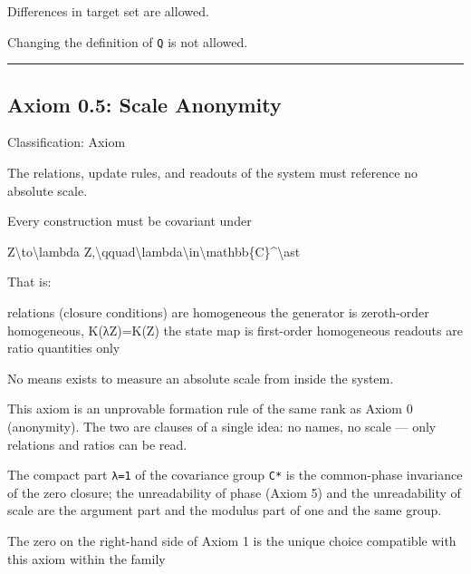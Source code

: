 \documentclass[
  a4paper,
]{article}
\newenvironment{Shaded}{}{}
\newcommand{\NormalTok}[1]{#1}
\begin{document}
Differences in target set are allowed.

Changing the definition of \texttt{Q} is not allowed.

\begin{center}\rule{0.5\linewidth}{0.5pt}\end{center}

\subsection{Axiom 0.5: Scale Anonymity}\label{axiom-0.5-scale-anonymity}

Classification: Axiom

The relations, update rules, and readouts of the system must reference
no absolute scale.

Every construction must be covariant under

\begin{Shaded}
\begin{Highlighting}[]
\NormalTok{Z\textbackslash{}to\textbackslash{}lambda Z,\textbackslash{}qquad\textbackslash{}lambda\textbackslash{}in\textbackslash{}mathbb\{C\}\^{}\textbackslash{}ast}
\end{Highlighting}
\end{Shaded}

That is:

\begin{Shaded}
\begin{Highlighting}[]
\NormalTok{relations (closure conditions) are homogeneous}
\NormalTok{the generator is zeroth{-}order homogeneous, K(λZ)=K(Z)}
\NormalTok{the state map is first{-}order homogeneous}
\NormalTok{readouts are ratio quantities only}
\end{Highlighting}
\end{Shaded}

No means exists to measure an absolute scale from inside the system.

This axiom is an unprovable formation rule of the same rank as Axiom 0
(anonymity). The two are clauses of a single idea: no names, no scale
--- only relations and ratios can be read.

The compact part \texttt{\textbar{}λ\textbar{}=1} of the covariance
group \texttt{C*} is the common-phase invariance of the zero closure;
the unreadability of phase (Axiom 5) and the unreadability of scale are
the argument part and the modulus part of one and the same group.

The zero on the right-hand side of Axiom 1 is the unique choice
compatible with this axiom within the family
\end{document}
